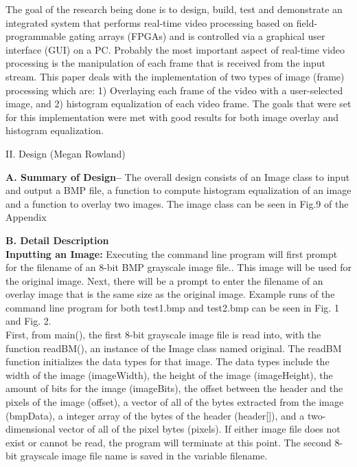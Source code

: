\documentclass{article}
\begin{document}
\begin{multicols*}{2}
{The goal of the research being done is to design,  build, test and demonstrate an integrated system that performs real-time video processing based on field-programmable gating arrays (FPGAs) and is controlled via a graphical user interface (GUI) on a PC. Probably the most important aspect of real-time video processing is the manipulation of each frame that is received from the input stream. This paper deals with the implementation of two types of image (frame) processing which are: 1) Overlaying each frame of the video with a user-selected image, and 2) histogram equalization of each video frame. The goals that were set for this implementation were met with good results for both image overlay and histogram equalization.
}


\begin{center}
{\large II. Design (Megan Rowland)}
\end{center}

{\bf A. Summary of Design--}  
The overall design consists of an Image class to input and output a BMP file, a function to compute histogram equalization of an image and a function to overlay two images. The image class can be seen in Fig.9 of the Appendix 

{\bf B. Detail Description}\\
{\bf Inputting an Image:}
Executing the command line program will first prompt for the filename of an 8-bit BMP grayscale image file.. This image will be used for the original image. Next, there will be a prompt to enter the filename of an overlay image that is the same size as the original image. 
Example runs of the command line program for both test1.bmp and test2.bmp can be seen in Fig. 1 and Fig. 2.\\
First, from main(), the first 8-bit grayscale image file is read into, with the function readBM(), an instance of the Image class named original. The readBM function initializes the data types for that image. The data types include the width of the image (imageWidth), the height of the image (imageHeight), the amount of bits for the image (imageBits), the offset between the header and the pixels of the image (offset), a vector of all of the bytes extracted from the image (bmpData), a integer array of the bytes of the header (header[]), and a two-dimensional vector of all of the pixel bytes (pixels). If either image file does not exist or cannot be read, the program will terminate at this point. The second 8-bit grayscale image file name is saved in the variable filename.


\end{multicols*}
\end{document}
